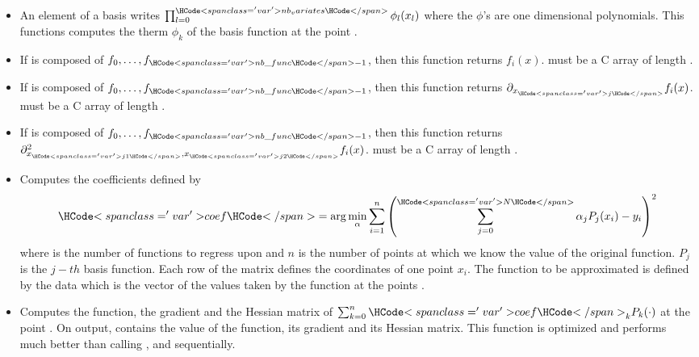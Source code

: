 \begin{itemize}
\item {}
  \sshortdescribe An element of a basis writes $\prod_{l=0}^{\var{nb_variates}}
  \phi_l(x_l)$ where the $\phi$'s are one dimensional polynomials. This
  functions computes the therm $\phi_k$ of the  basis function at the
  point .
\item  {}
  \sshortdescribe If  is composed of $f_0, \dots, f_{\var{nb\_func}-1}$,
  then this function returns $f_i(x)$.  must be a C array of length
  .

\item {}
  \sshortdescribe If  is composed of $f_0, \dots, f_{\var{nb\_func}-1}$,
  then this function returns $\partial_{x_{\var{j}}} f_i(x)$.  must be a C array
  of length .

  
\item {}
  \sshortdescribe If  is composed of $f_0, \dots, f_{\var{nb\_func}-1}$,
  then this function returns $\partial^2_{x_{\var{j1}}, x_{\var{j2}}}
  f_i(x)$.  must be a C array of length .


\item {}
  \sshortdescribe Computes the coefficients  defined by
  \begin{equation*}
    \var{coef} = \arg\min_\alpha \sum_{i=1}^n
    \left( \sum_{j=0}^{\var{N}} \alpha_j  P_j(x_i) - y_i\right)^2
  \end{equation*}
  where  is the number of functions to regress upon and $n$ is the
  number of points at which we know the value of the original function. $P_j$
  is the $j-th$ basis function. Each row of the matrix  defines the
  coordinates of one point $x_i$. The function to be approximated is defined
  by the data  which is the vector of the values taken by the function
  at the points .

\item {}
  \sshortdescribe Computes the function, the gradient and the Hessian matrix
  of $\sum_{k=0}^n \var{coef}_k  P_k(\cdot)$ at the point .
  On output,  contains the value of the function,  its
  gradient and  its Hessian matrix. This function is optimized and
  performs much better than calling ,
   and  sequentially.


\end{itemize}
